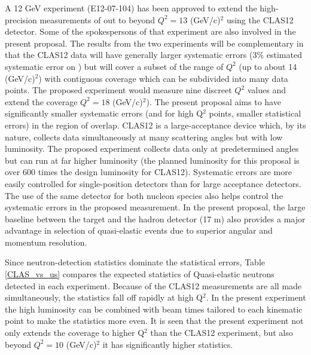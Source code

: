 \documentclass[12pt,letterpaper,oneside]{article}
\begin{document}
A 12 GeV experiment (E12-07-104) has been approved to extend
the high-precision measurements of \gmn out to beyond $Q^2=13$
(GeV/c)$^2$ using the CLAS12 detector.
Some of the spokespersons of that experiment are also involved in the
present proposal.
The results from the two experiments will be complementary in that 
the CLAS12 data will have generally larger systematic 
errors (3\% estimated systematic error on \gmnc)\cite{Jerry} 
but will cover a subset of the  range of $Q^2$ (up to about 14
(GeV/c)$^2$) with contiguous coverage which
can be subdivided into many data points.  
The proposed experiment would measure nine discreet  $Q^2$
values and extend the coverage $Q^2=18$ (GeV/c)$^2$). The present
proposal aims to have significantly
smaller systematic errors (and for high Q$^2$ points, smaller
statistical errors) in the 
region of overlap.  
CLAS12 is a large-acceptance device which, by its nature, collects data
simultaneously at many scattering angles but with low luminosity.  
The proposed experiment collects data only at predetermined angles but can
run at far higher luminosity (the planned luminosity for this proposal is 
over 600 times the design luminosity for CLAS12).  
Systematic errors are more easily controlled for single-position detectors 
than for large acceptance detectors.
The use of the same detector for both nucleon species also
helps control the systematic errors in the proposed measurement.
In the present proposal, the large baseline between the target
and the hadron detector (17 m) also provides a major advantage in 
selection of quasi-elastic events
due to superior angular and momentum resolution.

Since neutron-detection statistics dominate the statistical errors,
Table \ref{CLAS_vs_us} compares the expected statistics of 
Quasi-elastic neutrons
detected in each experiment.  Because of the CLAS12 measurements are all
made simultaneously, the statistics fall off rapidly at high Q$^2$.  In
the present experiment the high luminosity can be combined with beam
times tailored to each kinematic point to make the statistics more
even.  It is seen that the present experiment not only extends the
coverage to higher Q$^2$ than the CLAS12 experiment, but also beyond
$Q^2=10$ (GeV/c)$^2$ it has significantly higher statistics.
\end{document}
